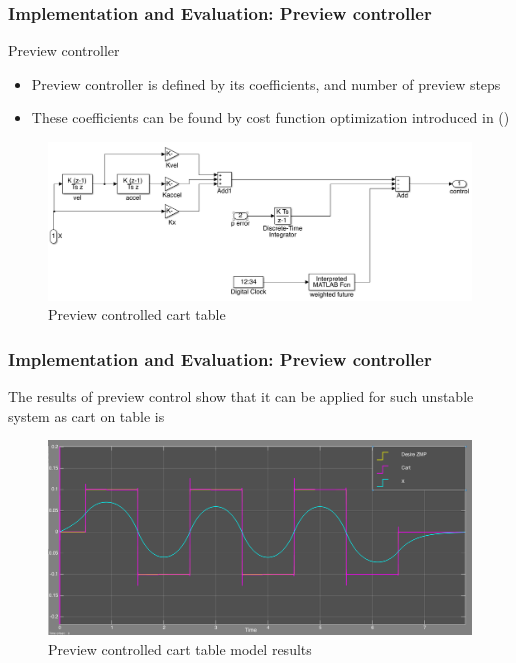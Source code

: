 \documentclass{beamer}
\begin{document}
	\begin{frame}
		\frametitle{Implementation and Evaluation: Preview controller}
		\begin{block}{Preview controller}
			\begin{itemize}
				\item
					Preview controller is defined by its coefficients, and number of preview steps
				\item
					These coefficients can be found by cost function optimization introduced in (\cite{katayama1985design})
			\end{itemize}
		\end{block}
		
		\begin{figure}[h!]
			\centering
			\includegraphics[width=0.8\linewidth]{presentation_images/23}
			\caption{Preview controlled cart table}
		\end{figure}
	\end{frame}
	

	\begin{frame}
		\frametitle{Implementation and Evaluation: Preview controller}
		The results of preview control show that it can be applied for such unstable system as cart on table is
		
		\begin{figure}[h!]
			\centering
			\includegraphics[width=0.8\linewidth]{presentation_images/24}
			\caption{Preview controlled cart table model results}
		\end{figure}
	\end{frame}
	
\end{document}
